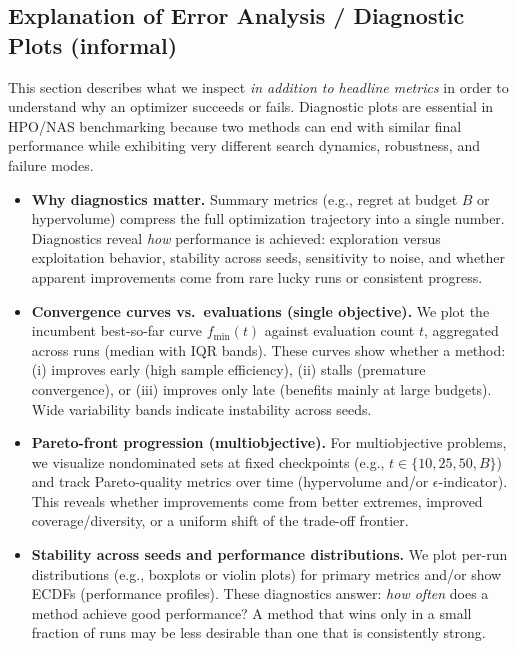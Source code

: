\subsection*{Explanation of Error Analysis / Diagnostic Plots (informal)}
This section describes what we inspect \emph{in addition to headline metrics} in order to understand why an optimizer succeeds or fails.
Diagnostic plots are essential in HPO/NAS benchmarking because two methods can end with similar final performance while exhibiting very different
search dynamics, robustness, and failure modes.

\begin{itemize}
    \item \textbf{Why diagnostics matter.}
    Summary metrics (e.g., regret at budget \(B\) or hypervolume) compress the full optimization trajectory into a single number.
    Diagnostics reveal \emph{how} performance is achieved: exploration versus exploitation behavior, stability across seeds, sensitivity to noise,
    and whether apparent improvements come from rare lucky runs or consistent progress.

    \item \textbf{Convergence curves vs.\ evaluations (single objective).}
    We plot the incumbent best-so-far curve \(f_{\min}(t)\) against evaluation count \(t\),
    aggregated across runs (median with IQR bands).
    These curves show whether a method:
    (i) improves early (high sample efficiency),
    (ii) stalls (premature convergence),
    or (iii) improves only late (benefits mainly at large budgets).
    Wide variability bands indicate instability across seeds.

    \item \textbf{Pareto-front progression (multiobjective).}
    For multiobjective problems, we visualize nondominated sets at fixed checkpoints (e.g., \(t\in\{10,25,50,B\}\))
    and track Pareto-quality metrics over time (hypervolume and/or \(\epsilon\)-indicator).
    This reveals whether improvements come from better extremes, improved coverage/diversity, or a uniform shift of the trade-off frontier.

    \item \textbf{Stability across seeds and performance distributions.}
    We plot per-run distributions (e.g., boxplots or violin plots) for primary metrics and/or show ECDFs (performance profiles).
    These diagnostics answer: \emph{how often} does a method achieve good performance?
    A method that wins only in a small fraction of runs may be less desirable than one that is consistently strong.


\end{itemize}
